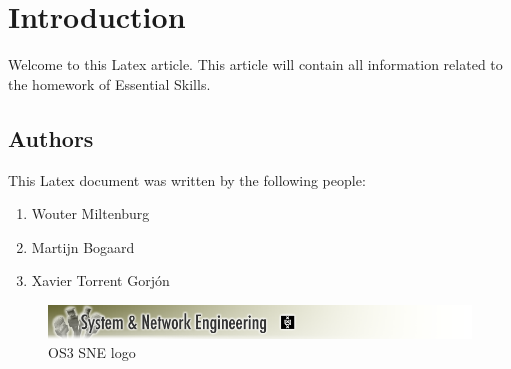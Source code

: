 \chapter{Introduction}
\label{chap:introduction}
Welcome to this Latex article. This article will contain all information related to the homework of Essential Skills.

\section{Authors}
This Latex document was written by the following people:
\begin{enumerate}
\item Wouter Miltenburg
\item Martijn Bogaard
\item Xavier Torrent Gorj\'on
\end{enumerate}


\begin{figure}[ht]
\includegraphics[width=15cm]{Chapters/00_intro_sne_logo.png}
\caption{OS3 SNE logo\footnotemark}
\end{figure}


